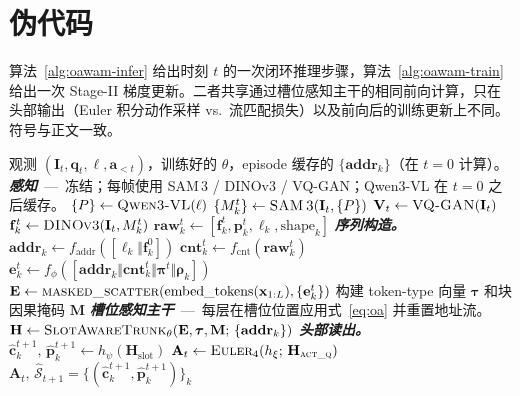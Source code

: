 \section{伪代码}
\label{app:pseudocode}

算法~\ref{alg:oawam-infer} 给出时刻 $t$ 的一次闭环推理步骤，算法~\ref{alg:oawam-train} 给出一次 Stage-II 梯度更新。二者共享通过槽位感知主干的相同前向计算，只在头部输出（Euler 积分动作采样 vs.\ 流匹配损失）以及前向后的训练更新上不同。符号与正文一致。

\begin{algorithm}[H]
\caption{\method{}在时刻 $t$ 的推理步骤。}
\label{alg:oawam-infer}
\begin{algorithmic}[1]
\Require 观测 $(\mathbf{I}_t,\mathbf{q}_t,\ell,\mathbf{a}_{<t})$，训练好的 $\theta$，episode 缓存的 $\{\mathbf{addr}_k\}$（在 $t{=}0$ 计算）。
\Statex \textit{\textbf{感知}} \,---\, 冻结；每帧使用 SAM\,3 / DINOv3 / VQ-GAN；Qwen3-VL 在 $t{=}0$ 之后缓存。
\State $\{P\}\gets\textsc{Qwen3-VL}(\ell)$
\State $\{M_k^t\}\gets\textsc{SAM\,3}(\mathbf{I}_t,\{P\})$
\State $\mathbf{V}_t\gets\textsc{VQ-GAN}(\mathbf{I}_t)$
\State $\mathbf{f}_k^t\gets\textsc{DINOv3}(\mathbf{I}_t,M_k^t)$
\State $\mathbf{raw}_k^t\gets[\mathbf{f}_k^t,\mathbf{p}_k^t,\boldsymbol{\ell}_k,\text{shape}_k]$
\Statex \textit{\textbf{序列构造。}}
    \State $\mathbf{addr}_k\gets f_\text{addr}([\boldsymbol{\ell}_k\Vert\mathbf{f}_k^{0}])$
\EndIf
\State $\mathbf{cnt}_k^t\gets f_\text{cnt}(\mathbf{raw}_k^t)$
\State $\mathbf{e}_k^t\gets f_\phi([\mathbf{addr}_k\Vert\mathbf{cnt}_k^t\Vert\boldsymbol{\pi}^t\Vert\boldsymbol{\rho}_k])$
\State $\mathbf{E}\gets\textsc{masked\_scatter}(\text{embed\_tokens}(\mathbf{x}_{1:L}),\{\mathbf{e}_k^t\})$
\State 构建 token-type 向量 $\boldsymbol{\tau}$ 和块因果掩码 $\mathbf{M}$
\Statex \textit{\textbf{槽位感知主干}} \,---\, 每层在槽位位置应用式~\eqref{eq:oa} 并重置地址流。
\State $\mathbf{H}\gets\textsc{SlotAwareTrunk}_\theta(\mathbf{E},\boldsymbol{\tau},\mathbf{M};\,\{\mathbf{addr}_k\})$
\Statex \textit{\textbf{头部读出。}}
\State $\hat{\mathbf{c}}_k^{t+1},\,\hat{\mathbf{p}}_k^{t+1}\gets h_\psi(\mathbf{H}_\text{slot})$ 
\State $\mathbf{A}_t\gets\textsc{Euler}_4(h_\xi;\,\mathbf{H}_{\textsc{act\_q}})$ 
\State \Return $\mathbf{A}_t,\,\widehat{\mathcal{S}}_{t+1}{=}\{(\hat{\mathbf{c}}_k^{t+1},\hat{\mathbf{p}}_k^{t+1})\}_k$
\end{algorithmic}
\end{algorithm}


